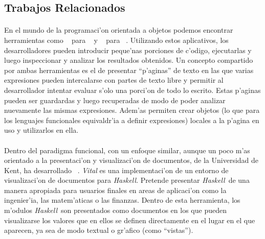 \documentclass[a4paper]{article}
\newcommand{\haskell}{\textsl{Haskell}}
\begin{document}
\subsection{Trabajos Relacionados}
\begin{epigraphs}
\end{epigraphs}
\paragraph{}En el mundo de la programaci'on orientada a objetos podemos encontrar herramientas como ~\cite{javascrapbook} para ~\cite{java} y ~\cite{insidesmalltalk, smalltalkworkspace} para ~\cite{smalltalk}.  Utilizando estos aplicativos, los desarrolladores pueden introducir peque'nas porciones de c'odigo, ejecutarlas y luego inspeccionar y analizar los resultados obtenidos.  Un concepto compartido por ambas herramientas es el de presentar ``p'aginas'' de texto en las que varias expresiones pueden intercalarse con partes de texto libre y permitir al desarrollador intentar evaluar s'olo una porci'on de todo lo escrito.  Estas p'aginas pueden ser guardardas y luego recuperadas de modo de poder analizar nuevamente las mismas expresiones.  Adem'as permiten crear objetos (lo que para los lenguajes funcionales equivaldr'ia a definir expresiones) locales a la p'agina en uso y utilizarlos en ella.
\paragraph{}Dentro del paradigma funcional, con un enfoque similar, aunque un poco m'as orientado a la presentaci'on y visualizaci'on de documentos,  de la Universidad de Kent, ha desarrollado ~\cite{vital}.  \textsl{Vital} es una implementaci'on de un entorno de visualizaci'on de documentos para \haskell.  Pretende presentar \haskell\ de una manera apropiada para usuarios finales en areas de aplicaci'on como la ingenier'ia, las matem'aticas o las finanzas.  Dentro de esta herramienta, los m'odulos \haskell\ son presentados como documentos en los que pueden visualizarse los valores que en ellos se definen directamente en el lugar en el que aparecen, ya sea de modo textual o gr'afico (como ``vistas''). 
\end{document}
